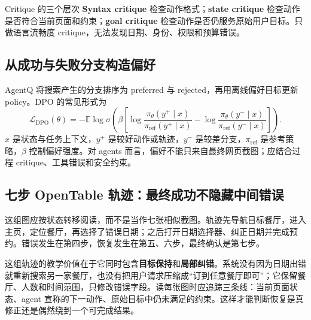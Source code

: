 
\begin{knowledgebox}{Critique 的三个层次}
\textbf{Syntax critique} 检查动作格式；\textbf{state critique} 检查动作是否符合当前页面和约束；\textbf{goal critique} 检查动作是否仍服务原始用户目标。只做语言流畅度 critique，无法发现日期、身份、权限和预算错误。
\end{knowledgebox}

\subsection{从成功与失败分支构造偏好}

AgentQ 将搜索产生的分支排序为 preferred 与 rejected，再用离线偏好目标更新 policy。DPO 的常见形式为
\[
\mathcal{L}_{\text{DPO}}(\theta)
=-\mathbb{E}\log\sigma\!\left(
\beta\left[
\log\frac{\pi_\theta(y^+\mid x)}{\pi_{\text{ref}}(y^+\mid x)}-
\log\frac{\pi_\theta(y^-\mid x)}{\pi_{\text{ref}}(y^-\mid x)}
\right]\right).
\]
$x$ 是状态与任务上下文，$y^+$ 是较好动作或轨迹，$y^-$ 是较差分支，$\pi_{\text{ref}}$ 是参考策略，$\beta$ 控制偏好强度。对 agents 而言，偏好不能只来自最终网页截图；应结合过程 critique、工具错误和安全约束。



\subsection{七步 OpenTable 轨迹：最终成功不隐藏中间错误}

这组图应按状态转移阅读，而不是当作七张相似截图。轨迹先导航目标餐厅，进入主页，定位餐厅，再选择了错误日期；之后打开日期选择器、纠正日期并完成预约。错误发生在第四步，恢复发生在第五、六步，最终确认是第七步。

这组轨迹的教学价值在于它同时包含\textbf{目标保持}和\textbf{局部纠错}。系统没有因为日期出错就重新搜索另一家餐厅，也没有把用户请求压缩成“订到任意餐厅即可”；它保留餐厅、人数和时间范围，只修改错误字段。读每张图时应追踪三条线：当前页面状态、agent 宣称的下一动作、原始目标中仍未满足的约束。这样才能判断恢复是真修正还是偶然绕到一个可完成结果。


